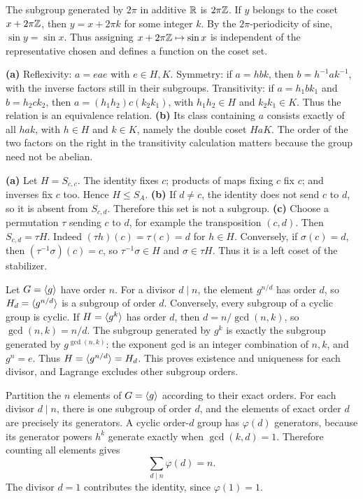 The subgroup generated by $2\pi$ in additive $\mathbb{R}$ is $2\pi\mathbb{Z}$. If $y$ belongs to the coset $x+2\pi\mathbb{Z}$, then $y=x+2\pi k$ for some integer $k$. By the $2\pi$-periodicity of sine, $\sin y=\sin x$. Thus assigning $x+2\pi\mathbb{Z}\mapsto\sin x$ is independent of the representative chosen and defines a function on the coset set.

\textbf{(a)} Reflexivity: $a=eae$ with $e\in H,K$. Symmetry: if $a=hbk$, then $b=h^{-1}ak^{-1}$, with the inverse factors still in their subgroups. Transitivity: if $a=h_1bk_1$ and $b=h_2ck_2$, then $a=(h_1h_2)c(k_2k_1)$, with $h_1h_2\in H$ and $k_2k_1\in K$. Thus the relation is an equivalence relation.
\textbf{(b)} Its class containing $a$ consists exactly of all $hak$, with $h\in H$ and $k\in K$, namely the double coset $HaK$. The order of the two factors on the right in the transitivity calculation matters because the group need not be abelian.

\textbf{(a)} Let $H=S_{c,c}$. The identity fixes $c$; products of maps fixing $c$ fix $c$; and inverses fix $c$ too. Hence $H\le S_A$.
\textbf{(b)} If $d\ne c$, the identity does not send $c$ to $d$, so it is absent from $S_{c,d}$. Therefore this set is not a subgroup.
\textbf{(c)} Choose a permutation $\tau$ sending $c$ to $d$, for example the transposition $(c,d)$. Then $S_{c,d}=\tau H$. Indeed $(\tau h)(c)=\tau(c)=d$ for $h\in H$. Conversely, if $\sigma(c)=d$, then $(\tau^{-1}\sigma)(c)=c$, so $\tau^{-1}\sigma\in H$ and $\sigma\in\tau H$. Thus it is a left coset of the stabilizer.

Let $G=\langle g\rangle$ have order $n$. For a divisor $d\mid n$, the element $g^{n/d}$ has order $d$, so $H_d=\langle g^{n/d}\rangle$ is a subgroup of order $d$. Conversely, every subgroup of a cyclic group is cyclic. If $H=\langle g^k\rangle$ has order $d$, then $d=n/\gcd(n,k)$, so $\gcd(n,k)=n/d$. The subgroup generated by $g^k$ is exactly the subgroup generated by $g^{\gcd(n,k)}$: the exponent gcd is an integer combination of $n,k$, and $g^n=e$. Thus $H=\langle g^{n/d}\rangle=H_d$. This proves existence and uniqueness for each divisor, and Lagrange excludes other subgroup orders.

Partition the $n$ elements of $G=\langle g\rangle$ according to their exact orders. For each divisor $d\mid n$, there is one subgroup of order $d$, and the elements of exact order $d$ are precisely its generators. A cyclic order-$d$ group has $\varphi(d)$ generators, because its generator powers $h^k$ generate exactly when $\gcd(k,d)=1$. Therefore counting all elements gives
\[\boxed{\sum_{d\mid n}\varphi(d)=n.}\]
The divisor $d=1$ contributes the identity, since $\varphi(1)=1$.

